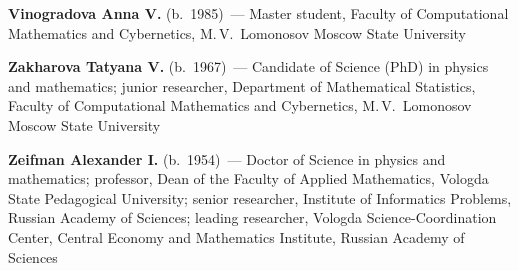 \begin{multicols}{2}
\vspace*{6pt}

\noindent
\textbf{Vinogradova Anna V.} (b.\ 1985)~--- Master student, Faculty of 
Computational Mathematics and Cybernetics, M.\,V.~Lomonosov Moscow State University

\vspace*{6pt}

\noindent
\textbf{Zakharova Tatyana V.} (b.\ 1967)~--- Candidate of Science (PhD) in 
physics and mathematics; junior researcher, Department of Mathematical Statistics, Faculty of 
Computational Mathematics and Cybernetics, M.\,V.~Lomonosov Moscow State University

\vspace*{6pt}

\noindent
\textbf{Zeifman Alexander I.} (b.\ 1954)~--- Doctor of Science in physics and 
mathematics; professor, Dean of the Faculty of Applied Mathematics, Vologda State 
Pedagogical University; senior researcher, Institute of Informatics Problems, Russian Academy 
of Sciences; leading researcher, Vologda Science-Coordination Center, Central Economy and 
Mathematics Institute, Russian Academy of Sciences

\end{multicols}